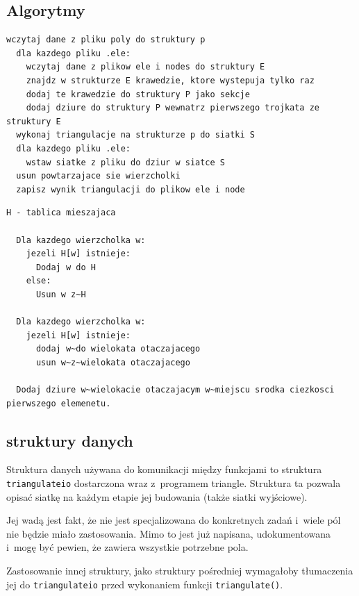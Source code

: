 \documentclass[a4paper]{article} \usepackage{setspace}
\begin{document}
\subsection{Algorytmy}
\begin{lstlisting}[caption=Pseudokod algorytmu głównej funkcji programu sklejającej siatki]
  wczytaj dane z pliku poly do struktury p
  dla kazdego pliku .ele:
    wczytaj dane z plikow ele i nodes do struktury E
    znajdz w strukturze E krawedzie, ktore wystepuja tylko raz
    dodaj te krawedzie do struktury P jako sekcje
    dodaj dziure do struktury P wewnatrz pierwszego trojkata ze struktury E
  wykonaj triangulacje na strukturze p do siatki S
  dla kazdego pliku .ele:
    wstaw siatke z pliku do dziur w siatce S
  usun powtarzajace sie wierzcholki
  zapisz wynik triangulacji do plikow ele i node
\end{lstlisting}

\begin{lstlisting}[caption=Pseudokod funkcji szukającej wielokąta otaczającego daną siatkę: \texttt{bounding\_polygon}]
  H - tablica mieszajaca

  Dla kazdego wierzcholka w:
    jezeli H[w] istnieje:
      Dodaj w do H
    else:
      Usun w z~H

  Dla kazdego wierzcholka w:
    jezeli H[w] istnieje:
      dodaj w~do wielokata otaczajacego
      usun w~z~wielokata otaczajacego

  Dodaj dziure w~wielokacie otaczajacym w~miejscu srodka ciezkosci pierwszego elemenetu.

\end{lstlisting}

\subsection{struktury danych}
Struktura danych używana do komunikacji między funkcjami to struktura \texttt{triangulateio} dostarczona wraz z~programem triangle.
Struktura ta pozwala opisać siatkę na każdym etapie jej budowania (także siatki wyjściowe).

Jej wadą jest fakt, że nie jest specjalizowana do konkretnych zadań i~wiele pól nie będzie miało zastosowania.
Mimo to jest już napisana, udokumentowana i~mogę być pewien, że zawiera wszystkie potrzebne pola.

Zastosowanie innej struktury, jako struktury pośredniej wymagałoby tłumaczenia jej do \texttt{triangulateio} przed wykonaniem funkcji \texttt{triangulate()}.
\end{document}
